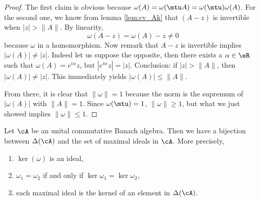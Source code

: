 \begin{proof}
The first claim is obvious because $\omega(A)=\omega(\mtu A)=\omega(\mtu)\omega(A)$.  For the second one, we know from lemma \ref{lem:cv_Ak} that $(A-z)$ is invertible when $|z|>\|A\|$. By 
linearity,
\[
\omega(A-z)=\omega(A)-z\neq 0
\]
because $\omega$ in a homomorphism. Now remark that $A-z$ is invertible implies $|\omega(A)|\neq |z|$. Indeed let us suppose the opposite, then there exists a $\alpha\in\eR$ such that $\omega(A)=e^{i\alpha}z$, but $|e^{i\alpha}z|=|z|$. Conclusion: if $|z|>\|A\|$, then $|\omega(A)|\neq|z|$. This immediately yields $|\omega(A)|\leq\|A\|$.

From there, it is clear that $\|\omega\|=1$ because the norm is the supremum of $|\omega(A)|$ with $\|A\|=1$. Since $\omega(\mtu)=1$, $\|\omega\|\geq 1$, but what we just showed implies $\|\omega\|\leq 1$.

\end{proof}

\begin{theorem}
Let $\cA$ be an unital commutative Banach algebra. Then we have a bijection between $\Delta(\cA)$ and the set of maximal ideals in $\cA$. More precisely,

\begin{enumerate}
\item $\ker(\omega)$ is an ideal,                   \label{enuei}
\item $\omega_1=\omega_2$ if and only if $\ker\omega_1=\ker\omega_2$,   \label{enueii}  
\item each maximal ideal is the kernel of an element in $\Delta(\cA)$.  \label{enueiii}
\end{enumerate}\label{tho:ideal_kernel}
\end{theorem}


